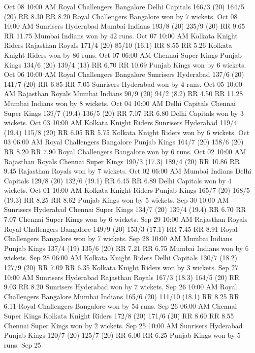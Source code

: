 Oct 08
10:00 AM
Royal Challengers Bangalore
Delhi Capitals
166/3 (20)
164/5 (20)
RR 8.30
RR 8.20
Royal Challengers Bangalore won by 7 wickets.
Oct 08
10:00 AM
Sunrisers Hyderabad
Mumbai Indians
193/8 (20)
235/9 (20)
RR 9.65
RR 11.75
Mumbai Indians won by 42 runs.
Oct 07
10:00 AM
Kolkata Knight Riders
Rajasthan Royals
171/4 (20)
85/10 (16.1)
RR 8.55
RR 5.26
Kolkata Knight Riders won by 86 runs.
Oct 07
06:00 AM
Chennai Super Kings
Punjab Kings
134/6 (20)
139/4 (13)
RR 6.70
RR 10.69
Punjab Kings won by 6 wickets.
Oct 06
10:00 AM
Royal Challengers Bangalore
Sunrisers Hyderabad
137/6 (20)
141/7 (20)
RR 6.85
RR 7.05
Sunrisers Hyderabad won by 4 runs.
Oct 05
10:00 AM
Rajasthan Royals
Mumbai Indians
90/9 (20)
94/2 (8.2)
RR 4.50
RR 11.28
Mumbai Indians won by 8 wickets.
Oct 04
10:00 AM
Delhi Capitals
Chennai Super Kings
139/7 (19.4)
136/5 (20)
RR 7.07
RR 6.80
Delhi Capitals won by 3 wickets.
Oct 03
10:00 AM
Kolkata Knight Riders
Sunrisers Hyderabad
119/4 (19.4)
115/8 (20)
RR 6.05
RR 5.75
Kolkata Knight Riders won by 6 wickets.
Oct 03
06:00 AM
Royal Challengers Bangalore
Punjab Kings
164/7 (20)
158/6 (20)
RR 8.20
RR 7.90
Royal Challengers Bangalore won by 6 runs.
Oct 02
10:00 AM
Rajasthan Royals
Chennai Super Kings
190/3 (17.3)
189/4 (20)
RR 10.86
RR 9.45
Rajasthan Royals won by 7 wickets.
Oct 02
06:00 AM
Mumbai Indians
Delhi Capitals
129/8 (20)
132/6 (19.1)
RR 6.45
RR 6.89
Delhi Capitals won by 4 wickets.
Oct 01
10:00 AM
Kolkata Knight Riders
Punjab Kings
165/7 (20)
168/5 (19.3)
RR 8.25
RR 8.62
Punjab Kings won by 5 wickets.
Sep 30
10:00 AM
Sunrisers Hyderabad
Chennai Super Kings
134/7 (20)
139/4 (19.4)
RR 6.70
RR 7.07
Chennai Super Kings won by 6 wickets.
Sep 29
10:00 AM
Rajasthan Royals
Royal Challengers Bangalore
149/9 (20)
153/3 (17.1)
RR 7.45
RR 8.91
Royal Challengers Bangalore won by 7 wickets.
Sep 28
10:00 AM
Mumbai Indians
Punjab Kings
137/4 (19)
135/6 (20)
RR 7.21
RR 6.75
Mumbai Indians won by 6 wickets.
Sep 28
06:00 AM
Kolkata Knight Riders
Delhi Capitals
130/7 (18.2)
127/9 (20)
RR 7.09
RR 6.35
Kolkata Knight Riders won by 3 wickets.
Sep 27
10:00 AM
Sunrisers Hyderabad
Rajasthan Royals
167/3 (18.3)
164/5 (20)
RR 9.03
RR 8.20
Sunrisers Hyderabad won by 7 wickets.
Sep 26
10:00 AM
Royal Challengers Bangalore
Mumbai Indians
165/6 (20)
111/10 (18.1)
RR 8.25
RR 6.11
Royal Challengers Bangalore won by 54 runs.
Sep 26
06:00 AM
Chennai Super Kings
Kolkata Knight Riders
172/8 (20)
171/6 (20)
RR 8.60
RR 8.55
Chennai Super Kings won by 2 wickets.
Sep 25
10:00 AM
Sunrisers Hyderabad
Punjab Kings
120/7 (20)
125/7 (20)
RR 6.00
RR 6.25
Punjab Kings won by 5 runs.
Sep 25

